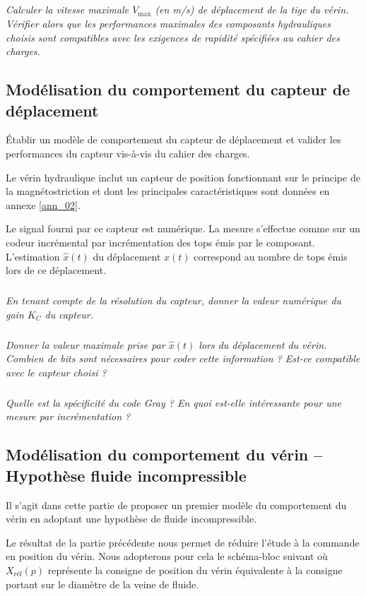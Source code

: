 \documentclass[10pt,fleqn]{article} %
\begin{document}
\subparagraph{}\textit{Calculer la vitesse maximale $V_{\text{max}}$ (en \si{m/s}) de déplacement de la tige du vérin. Vérifier alors que les performances maximales des composants hydrauliques choisis sont compatibles avec les exigences de rapidité spécifiées au cahier des charges.   }

\subsection{Modélisation du comportement du capteur de déplacement}

\begin{obj}
Établir un modèle de comportement du capteur de déplacement et valider les performances du capteur vis-à-vis du cahier des charges.
\end{obj}

Le vérin hydraulique inclut un capteur de position fonctionnant sur le principe de la magnétostriction et dont les principales caractéristiques sont données en annexe \ref{ann_02}.

Le signal fourni par ce capteur est numérique. La mesure s'effectue comme sur un codeur incrémental par incrémentation des tops émis par le composant. L'estimation $\hat{x}(t)$ du déplacement $x(t)$  correspond au nombre de tops émis lors de ce déplacement.


\subparagraph{}\textit{En tenant compte de la résolution du capteur, donner la valeur numérique du gain $K_C$ du capteur.   }

\subparagraph{}\textit{Donner la valeur maximale prise par $\hat{x}(t)$ lors du déplacement du vérin. Combien de bits sont nécessaires pour coder cette information ? Est-ce compatible avec le capteur choisi ?   }

\subparagraph{}\textit{Quelle est la spécificité du code Gray ? En quoi est-elle intéressante pour une mesure par incrémentation ? }

\subsection{Modélisation du comportement du vérin -- Hypothèse fluide incompressible}

\begin{obj}
Il s'agit dans cette partie de proposer un premier modèle du comportement du vérin en adoptant une hypothèse de fluide incompressible.
\end{obj}

Le résultat de la partie précédente nous permet de réduire l'étude à la commande en position du vérin. Nous adopterons pour cela le schéma-bloc suivant où $X_{\text{réf}}(p)$ représente la consigne de position du vérin équivalente à la consigne portant sur le diamètre de la veine de fluide.
\end{document}
